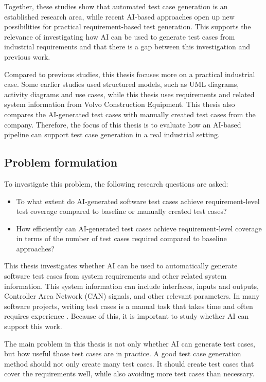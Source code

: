 \documentclass[a4paper,12pt]{article}
\begin{document}
Together, these studies show that automated test case generation is an established research area, while recent AI-based approaches open up new possibilities for practical requirement-based test generation. This supports the relevance of investigating how AI can be used to generate test cases from industrial requirements and that there is a gap between this investigation and previous work.

Compared to previous studies, this thesis focuses more on a practical industrial case. Some earlier studies used structured models, such as UML diagrams, activity diagrams and use cases, while this thesis uses requirements and related system information from Volvo Construction Equipment. This thesis also compares the AI-generated test cases with manually created test cases from the company. Therefore, the focus of this thesis is to evaluate how an AI-based pipeline can support test case generation in a real industrial setting. 

\subsection{Problem formulation}
\label{sec:problem_formulation}
\label{problem} 

To investigate this problem, the following research questions are asked:
\begin{itemize}
    \item To what extent do AI-generated software test cases achieve requirement-level test coverage compared to baseline or manually created test cases? 
    \item How efficiently can AI-generated test cases achieve requirement-level coverage in terms of the number of test cases required compared to baseline approaches?
\end{itemize}

This thesis investigates whether AI can be used to automatically generate software test cases from system requirements and other related system information. This system information can include interfaces, inputs and outputs, Controller Area Network (CAN) signals, and other relevant parameters. In many software projects, writing test cases is a manual task that takes time and often requires experience \cite{mustafa2021automated}. Because of this, it is important to study whether AI can support this work.

The main problem in this thesis is not only whether AI can generate test cases, but how useful those test cases are in practice. A good test case generation method should not only create many test cases. It should create test cases that cover the requirements well, while also avoiding more test cases than necessary.
\end{document}
